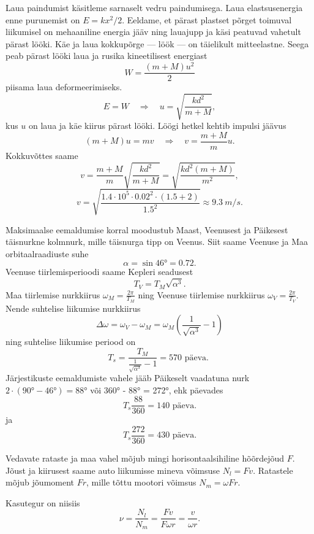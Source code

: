 \documentclass[10pt]{article}
\begin{document}
{
\solu
Laua paindumist käsitleme sarnaselt vedru paindumisega. Laua elastsusenergia enne purunemist on $E = kx^2/2$. Eeldame, et pärast plastset põrget toimuval liikumisel on mehaaniline energia jääv ning lauajupp ja käsi peatuvad vahetult pärast lööki. Käe ja laua kokkupõrge --- löök --- on täielikult mitteelastne. Seega peab pärast lööki laua ja rusika kineetilisest energiast
\[
W = \frac{(m+M)u^2}{2}
\]
piisama laua deformeerimiseks.
\[
E=W \quad \Rightarrow \quad u=\sqrt{\frac{k d^{2}}{m+M}},
\]
kus $u$ on laua ja käe kiirus pärast lööki. Löögi hetkel kehtib impulsi jäävus
\[
(m+M) u=m v \quad \Rightarrow \quad v=\frac{m+M}{m} u.
\]
Kokkuvõttes saame
\[
	v=\frac{m+M}{m} \sqrt{\frac{k d^{2}}{m+M}}=\sqrt{\frac{k d^{2}(m+M)}{m^{2}}},
\]
\[
	 v=\sqrt{\frac{\num{1,4} \cdot 10^{5} \cdot \num{0,02}^{2} \cdot(\num{1,5}+2)}{\num{1,5}^{2}}} \approx \SI{9,3}{m/s}.
\]
\probend
\bigskip


\solu
\osa Maksimaalse eemaldumise korral moodustub Maast, Veenusest ja Päikesest täisnurkne kolmnurk, mille täisnurga tipp on Veenus. Siit saame Veenuse ja Maa orbitaalraadiuste suhe
\[
\alpha = \sin \ang{46} = \num{0,72}.
\]
\osa Veenuse tiirlemisperioodi saame Kepleri seadusest
\[
T_V = T_M \sqrt{\alpha^3}.
\]
Maa tiirlemise nurkkiirus $\omega_M = \frac{2\pi}{T_M}$ ning Veenuse tiirlemise nurkkiirus $\omega_V = \frac{2\pi}{T_V}$. Nende suhtelise liikumise nurkkiirus
\[
\Delta \omega=\omega_{V}-\omega_{M}=\omega_{M}\left(\frac{1}{\sqrt{\alpha^{3}}}-1\right)
\]
ning suhtelise liikumise periood on
\[
T_{s}=\frac{T_{M}}{\frac{1}{\sqrt{\alpha^{3}}}-1}=570 \text { päeva. }
\]
Järjestikuste eemaldumiste vahele jääb Päikeselt vaadatuna nurk $2\cdot (\ang{90} - \ang{46}) = \ang{88}$ või \ang{360} - \ang{88} = \ang{272}, ehk päevades 
\[
T_s \frac{88}{360} = 140\text{ päeva.}
\]
ja 
\[
T_s \frac{272}{360} = 430\text{ päeva.}
\]
\probend
\bigskip


\solu
Vedavate rataste ja maa vahel mõjub mingi horisontaalsihiline hõõrdejõud $F$. Jõust ja kiirusest saame auto liikumisse mineva võimsuse $N_l = Fv$. Ratastele mõjub jõumoment $Fr$, mille tõttu mootori võimsus $N_{m}=\omega F r$.

Kasutegur on niisiis
\[
\nu=\frac{N_{l}}{N_{m}}=\frac{F v}{F \omega r}=\frac{v}{\omega r}.
\]
\probend
\bigskip

}
\end{document}
